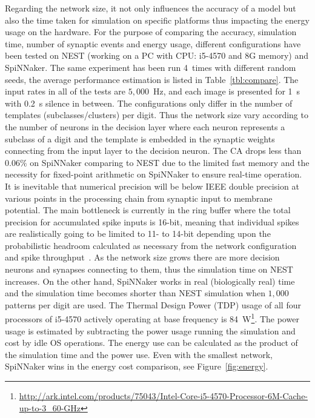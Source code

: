 \documentclass{frontiersENG} %
\begin{document}
Regarding the network size, it not only influences the accuracy of a model but also the time taken for simulation on specific platforms thus impacting the energy usage on the hardware.
For the purpose of comparing the accuracy, simulation time, number of synaptic events and energy usage, different configurations have been tested on NEST (working on a PC with CPU: i5-4570 and 8G memory) and SpiNNaker.
The same experiment has been run 4~times with different random seeds, the average performance estimation is listed in Table~\ref{tbl:compare}.
The input rates in all of the tests are $5,000$~Hz, and each image is presented for 1~s with 0.2~s silence in between.
The configurations only differ in the number of templates (subclasses/clusters) per digit.
Thus the network size vary according to the number of neurons in the decision layer where each neuron represents a subclass of a digit and the template is embedded in the synaptic weights connecting from the input layer to the decision neuron.
The CA drops less than $0.06\%$ on SpiNNaker comparing to NEST due to the limited fast memory and the necessity for fixed-point arithmetic on SpiNNaker to ensure real-time operation.
It is inevitable that numerical precision will be below IEEE double precision at various points in the processing chain from synaptic input to membrane potential.
The main bottleneck is currently in the ring buffer where the total precision for accumulated spike inputs is 16-bit, meaning that individual spikes are realistically going to be limited to 11- to 14-bit depending upon the probabilistic headroom calculated as necessary from the network configuration and spike throughput~\citep{Hopkins2015Accuracy}.
As the network size grows there are more decision neurons and synapses connecting to them, thus the simulation time on NEST increases.
On the other hand, SpiNNaker works in real (biologically real) time and the simulation time becomes shorter than NEST simulation when $1,000$ patterns per digit are used.
The Thermal Design Power (TDP) usage of all four processors of i5-4570 actively operating at base frequency is 84~W\footnote{\url{http://ark.intel.com/products/75043/Intel-Core-i5-4570-Processor-6M-Cache-up-to-3_60-GHz}}.
The power usage is estimated by subtracting the power usage running the simulation and cost by idle OS operations.
The energy use can be calculated as the product of the simulation time and the power use.
Even with the smallest network, SpiNNaker wins in the energy cost comparison, see Figure~\ref{fig:energy}.
\end{document}

